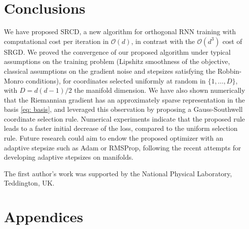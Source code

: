 \documentclass{article}
\begin{document}
\section{Conclusions}
We have proposed SRCD, a new algorithm for orthogonal RNN training with computational cost per iteration in $\mathcal{O}(d)$, in contrast with the $\mathcal{O}(d^3)$ cost of SRGD. We proved the convergence of our proposed algorithm under typical assumptions on the training problem (Lipshitz smoothness of the objective, classical assumptions on the gradient noise and stepsizes satisfying the Robbin-Monro conditions), for coordinates selected uniformly at random in $\{1, \dots, D\}$, with $D = d(d-1)/2$ the manifold dimension. We have also shown numerically that the Riemannian gradient has an approximately sparse representation in the basis \eqref{eq: basis}, and leveraged this observation by proposing a Gauss-Southwell coordinate selection rule. Numerical experiments indicate that the proposed rule leads to a faster initial decrease of the loss, compared to the uniform selection rule. Future research could aim to endow the proposed optimizer with an adaptive stepsize such as Adam or RMSProp, following the recent attempts \cite{Kasai2019, Becigneul2019, Lezcano2020} for developing adaptive stepsizes on manifolds.


\begin{ack}
The first author's work was supported by the National Physical Laboratory, Teddington, UK.
\end{ack}




\section{Appendices}
\end{document}
